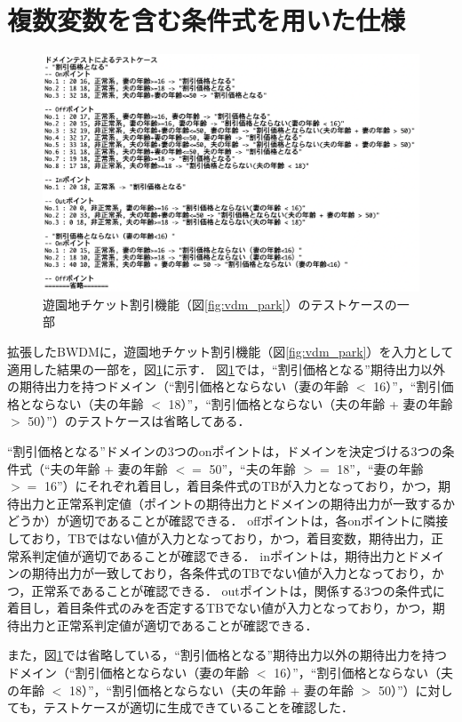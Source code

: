 \documentclass[uplatex, report, a4j, 10pt]{jsbook}
\begin{document}
\section{複数変数を含む条件式を用いた仕様}
\begin{figure}[tp]
  \centering
  \includegraphics[keepaspectratio, width=160mm]{figs/tekiyourei}
  \caption{遊園地チケット割引機能（図\ref{fig:vdm_park}）のテストケースの一部}
  \label{fig:park_testcase}
\end{figure}

拡張したBWDMに，遊園地チケット割引機能（図\ref{fig:vdm_park}）を入力として適用した結果の一部を，図\ref{fig:park_testcase}に示す．
図\ref{fig:park_testcase}では，“割引価格となる”期待出力以外の期待出力を持つドメイン（“割引価格とならない（妻の年齢 $<$ 16）”，“割引価格とならない（夫の年齢 $<$ 18）”，“割引価格とならない（夫の年齢 + 妻の年齢 $>$ 50）”）のテストケースは省略してある．

“割引価格となる”ドメインの3つのonポイントは，ドメインを決定づける3つの条件式（“夫の年齢 + 妻の年齢 $<=$ 50”，“夫の年齢 $>=$ 18”，“妻の年齢 $>=$ 16”）にそれぞれ着目し，着目条件式のTBが入力となっており，かつ，期待出力と正常系判定値（ポイントの期待出力とドメインの期待出力が一致するかどうか）が適切であることが確認できる．
offポイントは，各onポイントに隣接しており，TBではない値が入力となっており，かつ，着目変数，期待出力，正常系判定値が適切であることが確認できる．
inポイントは，期待出力とドメインの期待出力が一致しており，各条件式のTBでない値が入力となっており，かつ，正常系であることが確認できる．
outポイントは，関係する3つの条件式に着目し，着目条件式のみを否定するTBでない値が入力となっており，かつ，期待出力と正常系判定値が適切であることが確認できる．

また，図\ref{fig:park_testcase}では省略している，“割引価格となる”期待出力以外の期待出力を持つドメイン（“割引価格とならない（妻の年齢 $<$ 16）”，“割引価格とならない（夫の年齢 $<$ 18）”，“割引価格とならない（夫の年齢 + 妻の年齢 $>$ 50）”）に対しても，テストケースが適切に生成できていることを確認した．
\end{document}

